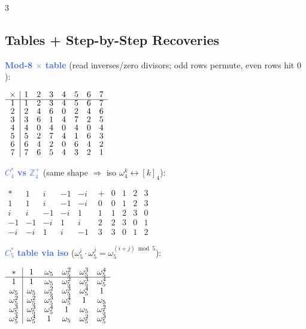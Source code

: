 \documentclass[9pt]{extarticle}
\newcommand{\ex}[1]{\textbf{\textcolor{RoyalBlue}{#1}}}
\begin{document}
\begin{multicols}{3}
\subsection{Tables + Step-by-Step Recoveries}
\begin{sloppypar}\raggedright
\ex{Mod-8 ${\times}$ table} (read inverses/zero divisors; odd rows permute, even rows hit $0$):\\
\end{sloppypar}
\begin{center}\scriptsize
${\renewcommand{\arraystretch}{0.82}\begin{array}{c|ccccccc}\times&1&2&3&4&5&6&7\\\hline1&1&2&3&4&5&6&7\\2&2&4&6&0&2&4&6\\3&3&6&1&4&7&2&5\\4&4&0&4&0&4&0&4\\5&5&2&7&4&1&6&3\\6&6&4&2&0&6&4&2\\7&7&6&5&4&3&2&1\end{array}}$
\end{center}
\begin{sloppypar}\raggedright
\ex{$C_4^*$ vs $\mathbb Z_4^+$} (same shape $\Rightarrow$ iso $\omega_4^k\leftrightarrow[k]_4$):\\
\end{sloppypar}
\begin{center}\scriptsize
$\begin{array}{c|cccc}*&1&i&{-}1&{-}i\\\hline1&1&i&{-}1&{-}i\\i&i&{-}1&{-}i&1\\{-}1&{-}1&{-}i&1&i\\{-}i&{-}i&1&i&{-}1\end{array}$\quad
$\begin{array}{c|cccc}+&0&1&2&3\\\hline0&0&1&2&3\\1&1&2&3&0\\2&2&3&0&1\\3&3&0&1&2\end{array}$
\end{center}
\begin{sloppypar}\raggedright
\ex{$C_5^*$ table via iso} ($\omega_5^i{\cdot}\omega_5^j{=}\omega_5^{(i+j)\bmod5}$):\\
\end{sloppypar}
\begin{center}\scriptsize
${\renewcommand{\arraystretch}{0.82}\begin{array}{c|ccccc}*&1&\omega_5&\omega_5^2&\omega_5^3&\omega_5^4\\\hline1&1&\omega_5&\omega_5^2&\omega_5^3&\omega_5^4\\\omega_5&\omega_5&\omega_5^2&\omega_5^3&\omega_5^4&1\\\omega_5^2&\omega_5^2&\omega_5^3&\omega_5^4&1&\omega_5\\\omega_5^3&\omega_5^3&\omega_5^4&1&\omega_5&\omega_5^2\\\omega_5^4&\omega_5^4&1&\omega_5&\omega_5^2&\omega_5^3\end{array}}$

\end{center}
\end{multicols}
\end{document}
